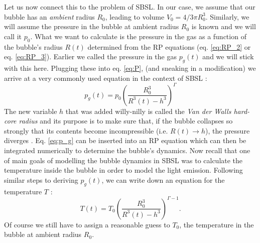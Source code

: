 \documentclass[rmp,aps,nofootinbib,superscriptaddress,floatfix]{revtex4-2}
\begin{document}
Let us now connect this to the problem of SBSL. In our case, we assume that our bubble has an \emph{ambient} radius $R_0$, leading to volume $V_0 =  4/3 \pi R_0^3$. Similarly, we will assume the pressure in the bubble at ambient radius $R_0$ is known and we will call it $p_0$. What we want to calculate is the pressure in the gas as a function of the bubble's radius $R(t)$ determined from the RP equations (eq. \ref{eq:RP_2} or eq. \ref{eq:RP_3}). Earlier we called the pressure in the gas $p_g(t)$ and we will stick with this here. Plugging these into eq. \ref{eq:P}, (and sneaking in a modification) we arrive at a very commonly used equation in the context of SBSL \cite{brenner2002single,lofstedt1995sonoluminescing,barber1997defining,lofstedt1993toward}:
\begin{equation}
    p_g(t) = p_0 \left( \frac{R_0^3}{R^3(t)-h^3} \right)^ \Gamma
    \label{eq:p_g}
\end{equation}
The new variable $h$ that was added willy-nilly is called the \emph{Van der Walls hard-core radius} and its purpose is to make sure that, if the bubble collapses so strongly that its contents become incompressible (i.e. $R(t)\rightarrow h$), the pressure diverges \cite{lofstedt1993toward,brenner2002single}. Eq. \ref{eq:p_g} can be inserted into an RP equation which can then be integrated numerically to determine the bubble's dynamics. Now recall that one of main goals of modelling the bubble dynamics in SBSL was to calculate the temperature inside the bubble in order to model the light emission. Following similar steps to deriving $p_g(t)$, we can write down an equation for the temperature $T$ \cite{barber1997defining,brenner2002single}:
\begin{equation}
    T(t) = T_0 \left( \frac{R_0^3}{R^3(t)-h^3} \right)^ {\Gamma-1}.
    \label{eq:T(t)}
\end{equation}
Of course we still have to assign a reasonable guess to $T_0$, the temperature in the bubble at ambient radius $R_0$.
\end{document}
